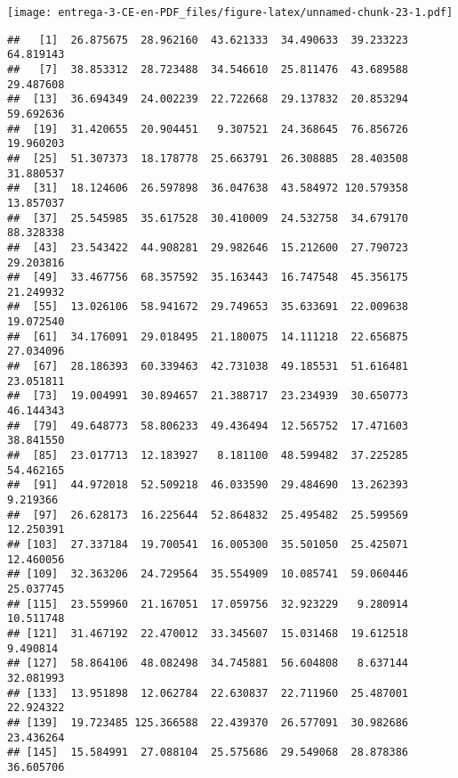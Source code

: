 \documentclass[
]{article}
\newenvironment{Shaded}{\begin{snugshade}}{\end{snugshade}}
\newcommand{\DataTypeTok}[1]{\textcolor[rgb]{0.13,0.29,0.53}{#1}}
\newcommand{\DecValTok}[1]{\textcolor[rgb]{0.00,0.00,0.81}{#1}}
\newcommand{\KeywordTok}[1]{\textcolor[rgb]{0.13,0.29,0.53}{\textbf{#1}}}
\newcommand{\NormalTok}[1]{#1}
\newcommand{\OperatorTok}[1]{\textcolor[rgb]{0.81,0.36,0.00}{\textbf{#1}}}
\newcommand{\StringTok}[1]{\textcolor[rgb]{0.31,0.60,0.02}{#1}}
\begin{document}
\texttt{[image: entrega-3-CE-en-PDF\_files/figure-latex/unnamed-chunk-23-1.pdf]}

\begin{Shaded}
\end{Shaded}

\begin{verbatim}
##   [1]  26.875675  28.962160  43.621333  34.490633  39.233223  64.819143
##   [7]  38.853312  28.723488  34.546610  25.811476  43.689588  29.487608
##  [13]  36.694349  24.002239  22.722668  29.137832  20.853294  59.692636
##  [19]  31.420655  20.904451   9.307521  24.368645  76.856726  19.960203
##  [25]  51.307373  18.178778  25.663791  26.308885  28.403508  31.880537
##  [31]  18.124606  26.597898  36.047638  43.584972 120.579358  13.857037
##  [37]  25.545985  35.617528  30.410009  24.532758  34.679170  88.328338
##  [43]  23.543422  44.908281  29.982646  15.212600  27.790723  29.203816
##  [49]  33.467756  68.357592  35.163443  16.747548  45.356175  21.249932
##  [55]  13.026106  58.941672  29.749653  35.633691  22.009638  19.072540
##  [61]  34.176091  29.018495  21.180075  14.111218  22.656875  27.034096
##  [67]  28.186393  60.339463  42.731038  49.185531  51.616481  23.051811
##  [73]  19.004991  30.894657  21.388717  23.234939  30.650773  46.144343
##  [79]  49.648773  58.806233  49.436494  12.565752  17.471603  38.841550
##  [85]  23.017713  12.183927   8.181100  48.599482  37.225285  54.462165
##  [91]  44.972018  52.509218  46.033590  29.484690  13.262393   9.219366
##  [97]  26.628173  16.225644  52.864832  25.495482  25.599569  12.250391
## [103]  27.337184  19.700541  16.005300  35.501050  25.425071  12.460056
## [109]  32.363206  24.729564  35.554909  10.085741  59.060446  25.037745
## [115]  23.559960  21.167051  17.059756  32.923229   9.280914  10.511748
## [121]  31.467192  22.470012  33.345607  15.031468  19.612518   9.490814
## [127]  58.864106  48.082498  34.745881  56.604808   8.637144  32.081993
## [133]  13.951898  12.062784  22.630837  22.711960  25.487001  22.924322
## [139]  19.723485 125.366588  22.439370  26.577091  30.982686  23.436264
## [145]  15.584991  27.088104  25.575686  29.549068  28.878386  36.605706

\end{verbatim}
\end{document}
